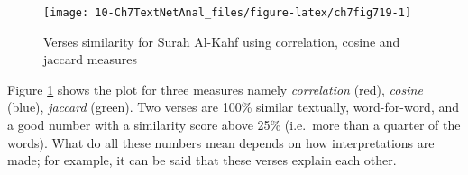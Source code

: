 \documentclass[
]{article}
\newenvironment{Shaded}{\begin{snugshade}}{\end{snugshade}}
\newcommand{\AttributeTok}[1]{\textcolor[rgb]{0.13,0.29,0.53}{#1}}
\newcommand{\DecValTok}[1]{\textcolor[rgb]{0.00,0.00,0.81}{#1}}
\newcommand{\FloatTok}[1]{\textcolor[rgb]{0.00,0.00,0.81}{#1}}
\newcommand{\FunctionTok}[1]{\textcolor[rgb]{0.13,0.29,0.53}{\textbf{#1}}}
\newcommand{\NormalTok}[1]{#1}
\newcommand{\OtherTok}[1]{\textcolor[rgb]{0.56,0.35,0.01}{#1}}
\newcommand{\SpecialCharTok}[1]{\textcolor[rgb]{0.81,0.36,0.00}{\textbf{#1}}}
\newcommand{\StringTok}[1]{\textcolor[rgb]{0.31,0.60,0.02}{#1}}
\begin{document}
\begin{figure}

{\centering \texttt{[image: 10-Ch7TextNetAnal\_files/figure-latex/ch7fig719-1]} 

}

\caption{Verses similarity for Surah Al-Kahf using correlation, cosine and jaccard measures}\label{fig:ch7fig719}
\end{figure}

Figure \ref{fig:ch7fig719} shows the plot for three measures namely \emph{correlation} (red), \emph{cosine} (blue), \emph{jaccard} (green). Two verses are 100\% similar textually, word-for-word, and a good number with a similarity score above 25\% (i.e.~more than a quarter of the words). What do all these numbers mean depends on how interpretations are made; for example, it can be said that these verses explain each other.

\begin{Shaded}
\end{Shaded}
\end{document}
